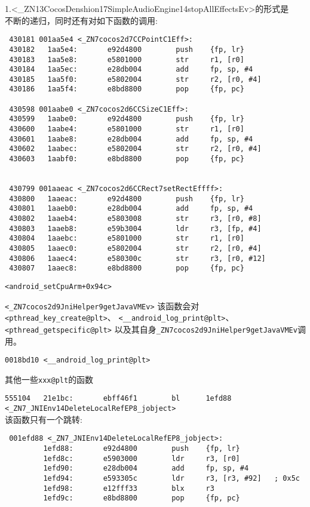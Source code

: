 1.<\_ZN13CocosDenshion17SimpleAudioEngine14stopAllEffectsEv>的形式是\\
不断的递归，同时还有对如下函数的调用:
\begin{lstlisting}
 430181 001aa5e4 <_ZN7cocos2d7CCPointC1Eff>:
 430182   1aa5e4:       e92d4800        push    {fp, lr}
 430183   1aa5e8:       e5801000        str     r1, [r0]
 430184   1aa5ec:       e28db004        add     fp, sp, #4
 430185   1aa5f0:       e5802004        str     r2, [r0, #4]
 430186   1aa5f4:       e8bd8800        pop     {fp, pc}

 430598 001aabe0 <_ZN7cocos2d6CCSizeC1Eff>:
 430599   1aabe0:       e92d4800        push    {fp, lr}
 430600   1aabe4:       e5801000        str     r1, [r0]
 430601   1aabe8:       e28db004        add     fp, sp, #4
 430602   1aabec:       e5802004        str     r2, [r0, #4]
 430603   1aabf0:       e8bd8800        pop     {fp, pc}


 430799 001aaeac <_ZN7cocos2d6CCRect7setRectEffff>:
 430800   1aaeac:       e92d4800        push    {fp, lr}
 430801   1aaeb0:       e28db004        add     fp, sp, #4
 430802   1aaeb4:       e5803008        str     r3, [r0, #8]
 430803   1aaeb8:       e59b3004        ldr     r3, [fp, #4]
 430804   1aaebc:       e5801000        str     r1, [r0]
 430805   1aaec0:       e5802004        str     r2, [r0, #4]
 430806   1aaec4:       e580300c        str     r3, [r0, #12]
 430807   1aaec8:       e8bd8800        pop     {fp, pc}
\end{lstlisting}

\verb|<android_setCpuArm+0x94c>|  

\verb|<_ZN7cocos2d9JniHelper9getJavaVMEv>| 
该函数会对\verb|<pthread_key_create@plt>|、
\verb|<__android_log_print@plt>|、
\verb|<pthread_getspecific@plt>|
以及其自身\verb|_ZN7cocos2d9JniHelper9getJavaVMEv|调用。


\verb|0018bd10 <__android_log_print@plt>|

其他一些\verb|xxx@plt|的函数

\verb|555104   21e1bc:       ebff46f1        bl      1efd88 <_ZN7_JNIEnv14DeleteLocalRefEP8_jobject>|\\

该函数只有一个跳转:\\
\begin{lstlisting}
 001efd88 <_ZN7_JNIEnv14DeleteLocalRefEP8_jobject>:
         1efd88:       e92d4800        push    {fp, lr}
         1efd8c:       e5903000        ldr     r3, [r0]
         1efd90:       e28db004        add     fp, sp, #4
         1efd94:       e593305c        ldr     r3, [r3, #92]   ; 0x5c
         1efd98:       e12fff33        blx     r3
         1efd9c:       e8bd8800        pop     {fp, pc}
\end{lstlisting}

